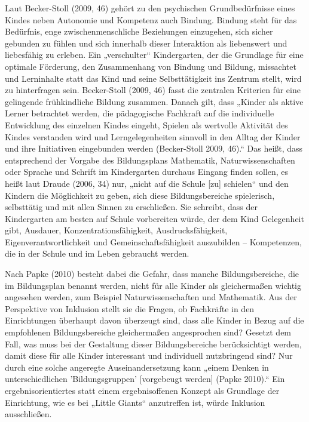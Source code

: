 Laut Becker-Stoll (2009, 46) gehört zu den psychischen Grundbedürfnisse eines Kindes neben Autonomie und Kompetenz auch Bindung. Bindung steht für das Bedürfnis, enge zwischenmenschliche Beziehungen einzugehen, sich sicher gebunden zu fühlen und sich innerhalb dieser Interaktion als liebenswert und liebesfähig zu erleben. Ein „verschulter“ Kindergarten, der die Grundlage für eine optimale Förderung, den Zusammenhang von Bindung und Bildung,  missachtet und Lerninhalte statt das Kind und seine Selbsttätigkeit ins Zentrum stellt, wird zu hinterfragen sein. 
Becker-Stoll (2009, 46) fasst die zentralen Kriterien für eine gelingende frühkindliche Bildung zusammen. Danach gilt, dass 
„Kinder als aktive Lerner betrachtet werden,
die pädagogische Fachkraft auf die individuelle Entwicklung des einzelnen Kindes eingeht,
Spielen als wertvolle Aktivität des Kindes verstanden wird und 
Lerngelegenheiten sinnvoll in den Alltag der Kinder und ihre Initiativen eingebunden werden (Becker-Stoll 2009, 46).“
Das heißt, dass entsprechend der Vorgabe des Bildungsplans Mathematik, Naturwissenschaften oder Sprache und Schrift im Kindergarten durchaus Eingang finden sollen, es heißt laut Draude (2006, 34) nur, „nicht auf die Schule [zu] schielen“ und den Kindern die Möglichkeit zu geben, sich diese Bildungsbereiche spielerisch, selbsttätig und mit allen Sinnen zu erschließen. Sie schreibt, dass der Kindergarten am besten auf Schule vorbereiten würde, der dem Kind Gelegenheit gibt, Ausdauer, Konzentrationsfähigkeit, Ausdrucksfähigkeit, Eigenverantwortlichkeit und Gemeinschaftsfähigkeit auszubilden – Kompetenzen, die in der Schule und im Leben gebraucht werden.

Nach Papke (2010) besteht dabei die Gefahr, dass manche Bildungsbereiche, die im Bildungsplan benannt werden, nicht für alle Kinder als gleichermaßen wichtig angesehen werden, zum Beispiel Naturwissenschaften und Mathematik. Aus der Perspektive von Inklusion stellt sie die Fragen, ob Fachkräfte in den Einrichtungen überhaupt davon überzeugt sind, dass alle Kinder in Bezug auf die empfohlenen Bildungsbereiche gleichermaßen angesprochen sind? Gesetzt dem Fall, was muss bei der Gestaltung dieser Bildungsbereiche berücksichtigt werden, damit diese für alle Kinder interessant und individuell nutzbringend sind? Nur durch eine solche angeregte Auseinandersetzung kann „einem Denken in unterschiedlichen 'Bildungsgruppen' [vorgebeugt werden] (Papke 2010).“ 
Ein ergebnisorientiertes statt einem ergebnisoffenen Konzept als Grundlage der Einrichtung, wie es bei „Little Giants“ anzutreffen ist, würde Inklusion ausschließen. 
 
